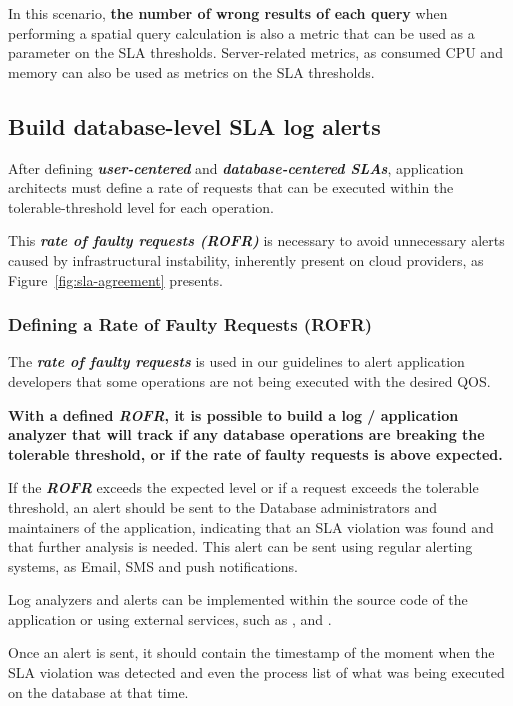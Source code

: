 In this scenario, \textbf{the number of wrong results of each query} when performing a spatial query calculation is also a metric that can be used as a parameter on the SLA thresholds. Server-related metrics, as consumed CPU and memory can also be used as metrics on the SLA thresholds.



\subsection{Build database-level SLA log alerts}

After defining \textbf{\textit{user-centered}} and \textbf{\textit{database-centered SLAs}}, application architects must define a rate of requests that can be executed within the tolerable-threshold level for each operation.

This \textbf{\textit{rate of faulty requests (ROFR)}} is necessary to avoid unnecessary alerts caused by infrastructural instability, inherently present on cloud providers, as Figure~\ref{fig:sla-agreement} presents.

\subsubsection{Defining a Rate of Faulty Requests (ROFR)}

The \textbf{\textit{rate of faulty requests}} is used in our guidelines to alert application developers that some operations are not being executed with the desired QOS.

\textbf{With a defined \textbf{\textit{ROFR}}, it is possible to build a log / application analyzer that will track if any database operations are breaking the tolerable threshold, or if the rate of faulty requests is above expected.}

If the \textbf{\textit{ROFR}} exceeds the expected level or if a request exceeds the tolerable threshold, an alert should be sent to the Database administrators and maintainers of the application, indicating that an SLA violation was found and that further analysis is needed. This alert can be sent using regular alerting systems, as Email, SMS and push notifications.

Log analyzers and alerts can be implemented within the source code of the application or using external services, such as \cite{logstash}, \cite{papertrail} and \cite{newrelic}. 

Once an alert is sent, it should contain the timestamp of the moment when the SLA violation was detected and even the process list of what was being executed on the database at that time.

